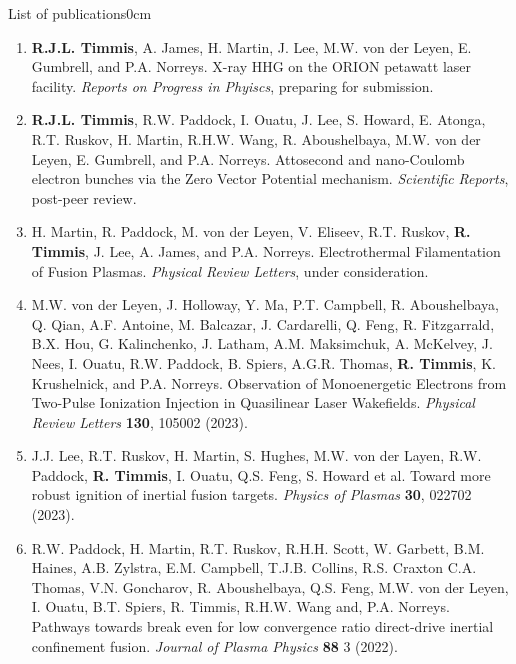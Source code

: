 \begin{mclistof}{List of publications}{0cm}
	\begin{enumerate}
		\item \textbf{R.J.L. Timmis}, A. James, H. Martin, J. Lee, M.W. von der Leyen, E. Gumbrell, and P.A. Norreys. X-ray HHG on the ORION petawatt laser facility. \textit{Reports on Progress in Phyiscs}, preparing for submission.
		\item \textbf{R.J.L. Timmis}, R.W. Paddock, I. Ouatu, J. Lee, S. Howard, E. Atonga, R.T. Ruskov, H. Martin, R.H.W. Wang, R. Aboushelbaya, M.W. von der Leyen, E. Gumbrell, and P.A. Norreys. Attosecond and nano-Coulomb electron bunches via the Zero Vector Potential mechanism. \textit{Scientific Reports}, post-peer review.
		\item H. Martin, R. Paddock, M. von der Leyen, V. Eliseev, R.T. Ruskov, \textbf{R. Timmis}, J. Lee, A. James, and P.A. Norreys. Electrothermal Filamentation of Fusion Plasmas. \textit{Physical Review Letters}, under consideration. 
		\item M.W. von der Leyen, J. Holloway, Y. Ma, P.T. Campbell, R. Aboushelbaya, Q. Qian, A.F. Antoine, M. Balcazar, J. Cardarelli, Q. Feng, R. Fitzgarrald, B.X. Hou, G. Kalinchenko, J. Latham, A.M. Maksimchuk, A. McKelvey, J. Nees, I. Ouatu, R.W. Paddock, B. Spiers, A.G.R. Thomas, \textbf{R. Timmis}, K. Krushelnick, and P.A. Norreys. Observation of Monoenergetic Electrons from Two-Pulse Ionization Injection in Quasilinear Laser Wakefields. \textit{Physical Review Letters} \textbf{130}, 105002 (2023).
		\item J.J. Lee, R.T. Ruskov, H. Martin, S. Hughes, M.W. von der Layen, R.W. Paddock, \textbf{R. Timmis}, I. Ouatu, Q.S. Feng, S. Howard et al. Toward more robust ignition of inertial fusion targets. \textit{Physics of Plasmas} \textbf{30}, 022702 (2023).
		\item R.W. Paddock, H. Martin, R.T. Ruskov, R.H.H. Scott, W. Garbett, B.M. Haines, A.B. Zylstra, E.M. Campbell, T.J.B. Collins, R.S. Craxton C.A. Thomas, V.N. Goncharov, R. Aboushelbaya, Q.S. Feng, M.W. von der Leyen, I. Ouatu, B.T. Spiers, R. Timmis, R.H.W. Wang and, P.A. Norreys. Pathways towards break even for low convergence ratio direct-drive inertial confinement fusion. \textit{Journal of Plasma Physics} \textbf{88} 3 (2022).

\end{enumerate}
\end{mclistof}
